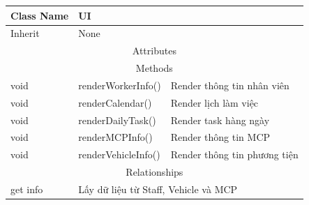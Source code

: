 \begin{enumerate}
        \begin{table}[htp]
            \begin{tabular}{|lll|}
                \hline
                \multicolumn{1}{|l|}{Class Name} & \multicolumn{2}{l|}{UI}                                                 \\ \hline
                \multicolumn{1}{|l|}{Inherit}    & \multicolumn{2}{l|}{None}                                               \\ \hline
                \multicolumn{3}{|c|}{\cellcolor[HTML]{FFFFC7}Attributes}                                                   \\ \hline
                \multicolumn{3}{|c|}{\cellcolor[HTML]{FFFFC7}Methods}                                                      \\ \hline
                \multicolumn{1}{|l|}{void}       & \multicolumn{1}{l|}{renderWorkerInfo()}  & Render thông tin nhân viên   \\ \hline
                \multicolumn{1}{|l|}{void}       & \multicolumn{1}{l|}{renderCalendar()}    & Render lịch làm việc         \\ \hline
                \multicolumn{1}{|l|}{void}       & \multicolumn{1}{l|}{renderDailyTask()}   & Render task hàng ngày        \\ \hline
                \multicolumn{1}{|l|}{void}       & \multicolumn{1}{l|}{renderMCPInfo()}     & Render thông tin MCP         \\ \hline
                \multicolumn{1}{|l|}{void}       & \multicolumn{1}{l|}{renderVehicleInfo()} & Render thông tin phương tiện \\ \hline
                \multicolumn{3}{|c|}{\cellcolor[HTML]{FFFFC7}Relationships}                                                \\ \hline
                \multicolumn{1}{|l|}{get info}   & \multicolumn{2}{l|}{Lấy dữ liệu từ Staff, Vehicle và MCP}               \\ \hline
            \end{tabular}
        \end{table}
    \end{enumerate}